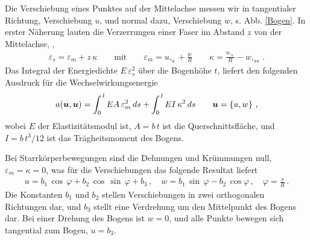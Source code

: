 Die Verschiebung eines Punktes auf der Mittelachse messen wir in tangentialer Richtung,
Verschiebung $u$, und normal dazu, Verschiebung $w$, s. Abb. \ref{Bogen}. In erster N\"{a}herung lauten die
Verzerrungen  einer Faser im Abstand $z$ von der Mittelachse, \cite{Cook1},
\begin{align}
\varepsilon_s = \varepsilon_m + z\,\kappa \qquad \mbox{mit} \qquad \varepsilon_m = u,_s
+ \frac{w}{R} \qquad \kappa = \frac{u,_s}{R} - w,_{ss}\,.
\end{align}
Das Integral der Energiedichte $E\,\varepsilon_s^2$ \"{u}ber die Bogenh\"{o}he $t$, liefert den
folgenden Ausdruck f\"{u}r die Wechselwirkungsenergie
\begin{align}\label{EnergieA61}
a(\mbox{\boldmath $u$},\mbox{\boldmath $u$}) = \int_0^{\,l} EA\,\varepsilon_m^2\,ds + \int_0^{\,l} EI\,\kappa^2 \,ds
\qquad\mbox{\boldmath $u$} = \left\{u,w\right\}\,,
\end{align}
wobei $E$ der Elastizit\"{a}tsmodul ist, $A = b\,t$ ist die Querschnittsfl\"{a}che, und $I =
b\,t^3/12$ ist das Tr\"{a}gheitsmoment des Bogens.

Bei Starrk\"{o}rperbewegungen sind die Dehnungen und Kr\"{u}mmungen null, $\varepsilon_m =
\kappa = 0$, was f\"{u}r die Verschiebungen das folgende Resultat liefert
\begin{align}
u = b_1\,\cos\,\varphi + b_2\,\cos\,\sin\,\varphi + b_3\,,\quad w = b_1\,\sin\,\varphi -
b_2\,\cos \varphi\,, \quad \varphi = \frac{s}{R}\,.
\end{align}
Die Konstanten $b_1$ und $b_2$ stellen Verschiebungen in zwei orthogonalen Richtungen
dar, und $b_3$ stellt eine Verdrehung um den Mittelpunkt des Bogens dar. Bei einer
Drehung des Bogens ist $w = 0$, und alle Punkte bewegen sich tangential zum Bogen, $u =
b_3$.

